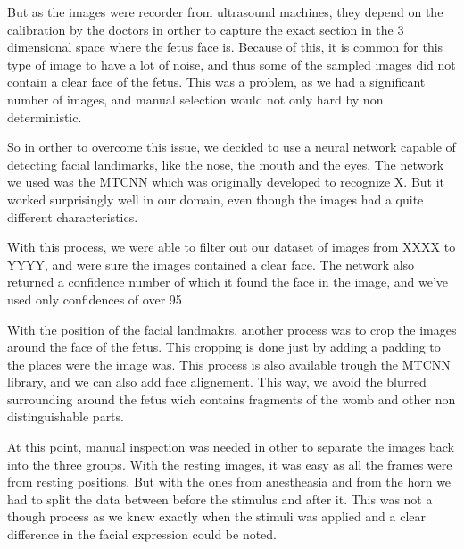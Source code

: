 But as the images were recorder from ultrasound machines, they depend on the calibration by the doctors in orther to capture the exact section in the 3 dimensional space where the fetus face is. Because of this, it is common for this type of image to have a lot of noise, and thus some of the sampled images did not contain a clear face of the fetus. This was a problem, as we had a significant number of images, and manual selection would not only hard by non deterministic.

So in orther to overcome this issue, we decided to use a neural network capable of detecting facial landimarks, like the nose, the mouth and the eyes. The network we used was the MTCNN \cite{} which was originally developed to recognize X. But it worked surprisingly well in our domain, even though the images had a quite different characteristics.

With this process, we were able to filter out our dataset of images from XXXX to YYYY, and were sure the images contained a clear face. The network also returned a confidence number of which it found the face in the image, and we've used only confidences of over 95%

With the position of the facial landmakrs, another process was to crop the images around the face of the fetus. This cropping is done just by adding a padding to the places were the image was. This process is also available trough the MTCNN library, and we can also add face alignement. This way, we avoid the blurred surrounding around the fetus wich contains fragments of the womb and other non distinguishable parts. 

At this point, manual inspection was needed in other to separate the images back into the three groups. With the resting images, it was easy as all the frames were from resting positions. But with the ones from anestheasia and from the horn we had to split the data between before the stimulus and after it. This was not a though process as we knew exactly when the stimuli was applied and a clear difference in the facial expression could be noted. 
